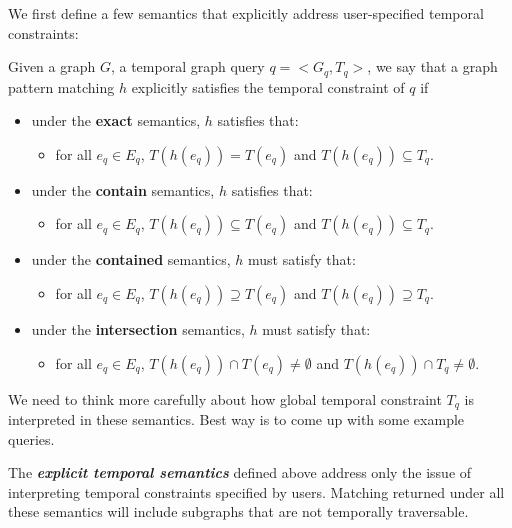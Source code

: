 We first define a few semantics that explicitly address user-specified temporal
constraints:

\begin{defn}
\label{explicit-temp-semantics}
Given a graph $G$, a temporal graph query $q= <G_q, T_q>$, we say that a graph
pattern matching $h$ explicitly satisfies the temporal constraint of $q$ if
\begin{itemize}
	\item under the {\bf exact} semantics, $h$ satisfies that:
	\begin{itemize}
		\item for all $e_q \in E_q$, $T(h(e_q)) = T(e_q)$ and $T(h(e_q))
                  \subseteq T_q$.
	\end{itemize}

	\item under the {\bf contain} semantics, $h$ satisfies that:
	\begin{itemize}
		\item for all $e_q \in E_q$, $T(h(e_q)) \subseteq T(e_q)$ and
                  $T(h(e_q)) \subseteq T_q$.
	\end{itemize}

	\item under the {\bf contained} semantics, $h$ must satisfy that:
	\begin{itemize}
		\item for all $e_q \in E_q$, $T(h(e_q)) \supseteq T(e_q)$ and
                  $T(h(e_q)) \supseteq T_q$.
	\end{itemize}

	\item under the {\bf intersection} semantics, $h$ must satisfy that:
	\begin{itemize}
		\item for all $e_q \in E_q$, $T(h(e_q)) \cap T(e_q) \not=
                  \emptyset $ and $T(h(e_q)) \cap T_q \not= \emptyset$.
	\end{itemize}

\end{itemize}
\end{defn}

 We need to think more carefully about how global temporal
constraint $T_q$ is interpreted in these semantics. Best way is to come up with
some example queries.

\SmallSpace

The {\bf {\em explicit temporal semantics}} defined above address only the issue
of interpreting temporal constraints specified by users. Matching returned under
all these semantics will include subgraphs that are not temporally traversable.

